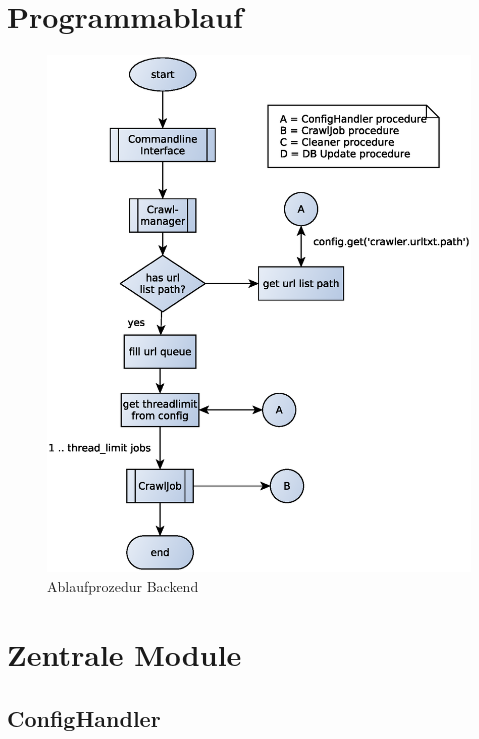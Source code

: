 \section{Programmablauf} 
\label{sec:programmablauf}
\begin{figure}[h]
	\centering
	\label{dia:design:backend:overview}
	\includegraphics[width=\textwidth]{design/backend/gfx/backend_procedure.eps}
	\caption{Ablaufprozedur Backend}
\end{figure}



\section{Zentrale Module} 
\label{sec:zentrale_module}

\subsection{ConfigHandler}
\label{sub:confighandler}
